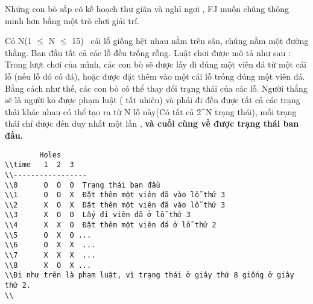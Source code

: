 Những con bò sắp có kế hoạch thư giãn và nghỉ ngơi , FJ muốn chúng thông minh hơn bằng một trò chơi giải trí.  

   Có N(1 $\le$ N $\le$ 15)  cái lỗ giống hệt nhau nằm trên sân, chúng nằm một đường thằng. Ban đầu tất cả các lỗ đều trống rỗng. Luật chơi được mô tả như sau : Trong lượt chơi của mình, các con bò sẽ được lấy đi đúng một viên đá từ một cái lỗ (nếu lỗ đó có đá), hoặc được đặt thêm vào một cái lỗ trống đúng một viên đá. Bằng cách như thế, các con bò có thể thay đổi trạng thái của các lỗ. Người thắng sẽ là người ko được phạm luật ( tất nhiên) và phải đi đến được tất cả các trạng thái khác nhau có thể tạo ra từ N lỗ này(Có tất cả 2^N trạng thái), mỗi trạng thái chỉ được đến duy nhất một lần ,   \textbf{    và cuối cùng về được trạng thái ban đầu.   }
\begin{verbatim}
        Holes
\\time   1  2  3 
\\-----------------
\\0      O  O  O  Trạng thái ban đầu
\\1      O  O  X  Đặt thêm một viên đã vào lỗ thứ 3
\\2      X  O  X  Đặt thêm một viên đã vào lỗ thứ 3
\\3      X  O  O  Lấy đi viên đã ở lỗ thứ 3
\\4      X  X  O  Đặt thêm một viên đá ở lỗ thứ 2
\\5      O  X  O ...
\\6      O  X  X  ...
\\7      X  X  X  ...
\\8      X  O  X ...
\\Đi như trên là phạm luật, vì trạng thái ở giây thứ 8 giống ở giây thứ 2.
\\\end{verbatim}